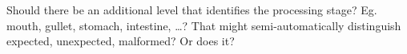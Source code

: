 \documentclass{book}
\begin{document}
Should there be an additional level that identifies the processing stage?
Eg.~ mouth, gullet, stomach, intestine, \ldots ?
That might semi-automatically distinguish expected, unexpected, malformed?
Or does it?


\backmatter
\printindex
\end{document}
